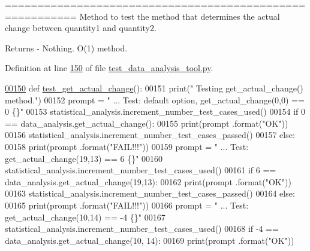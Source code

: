 ========================================================= Method to test the method that determines the actual change between quantity1 and quantity2. 

\begin{DoxyReturn}{Returns}
-\/ Nothing. O(1) method. 
\end{DoxyReturn}


Definition at line \hyperlink{test__data__analysis__tool_8py_source_l00150}{150} of file \hyperlink{test__data__analysis__tool_8py_source}{test\+\_\+data\+\_\+analysis\+\_\+tool.\+py}.


\begin{DoxyCode}
\hypertarget{classstatistics_1_1test__data__analysis__tool_1_1data__analysis__tester_l00150}{}\hyperlink{classstatistics_1_1test__data__analysis__tool_1_1data__analysis__tester_af355b89d75dbd6f03b47a52bcfdb9025}{00150}     \textcolor{keyword}{def }\hyperlink{classstatistics_1_1test__data__analysis__tool_1_1data__analysis__tester_af355b89d75dbd6f03b47a52bcfdb9025}{test\_get\_actual\_change}():
00151         print(\textcolor{stringliteral}{" Testing get\_actual\_change() method."})
00152         prompt = \textcolor{stringliteral}{"  ... Test: default option, get\_actual\_change(0,0) == 0   \{\}"}
00153         statistical\_analysis.increment\_number\_test\_cases\_used()
00154         \textcolor{keywordflow}{if} 0 == data\_analysis.get\_actual\_change():
00155             print(prompt .format(\textcolor{stringliteral}{"OK"}))
00156             statistical\_analysis.increment\_number\_test\_cases\_passed()
00157         \textcolor{keywordflow}{else}:
00158             print(prompt .format(\textcolor{stringliteral}{"FAIL!!!"}))
00159         prompt = \textcolor{stringliteral}{"  ... Test: get\_actual\_change(19,13) == 6         \{\}"}
00160         statistical\_analysis.increment\_number\_test\_cases\_used()
00161         \textcolor{keywordflow}{if} 6 == data\_analysis.get\_actual\_change(19,13):
00162             print(prompt .format(\textcolor{stringliteral}{"OK"}))
00163             statistical\_analysis.increment\_number\_test\_cases\_passed()
00164         \textcolor{keywordflow}{else}:
00165             print(prompt .format(\textcolor{stringliteral}{"FAIL!!!"}))
00166         prompt = \textcolor{stringliteral}{"  ... Test: get\_actual\_change(10,14) == -4        \{\}"}
00167         statistical\_analysis.increment\_number\_test\_cases\_used()
00168         \textcolor{keywordflow}{if} -4 == data\_analysis.get\_actual\_change(10, 14):
00169             print(prompt .format(\textcolor{stringliteral}{"OK"}))

\end{DoxyCode}
